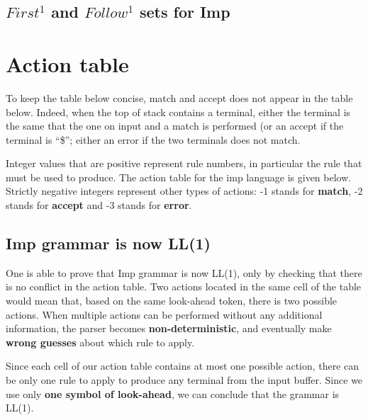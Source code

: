 \subsection{$First^1$ and $Follow^1$ sets for Imp}

    {\small\ttfamily
      
    }


\section{Action table}

To keep the table below concise, match and accept does not appear in the table below. Indeed, when the top of stack
contains a terminal, either the terminal is the same that the one on input and a match is performed (or an accept if the
terminal is ``\$''; either an error if the two terminals does not match.

Integer values that are positive represent rule numbers, in particular the rule that must be used to produce. The
action table for the imp language is given below.
Strictly negative integers represent other types of actions: -1 stands for \textbf{match}, -2 stands for \textbf{accept} and -3 stands for \textbf{error}.

{\small\ttfamily
  
}


\subsection{Imp grammar is now LL(1)}

One is able to prove that Imp grammar is now LL(1), only by checking that there is no conflict in the action table.
Two actions located in the same cell of the table would mean that, based on the same look-ahead token, 
there is two possible actions. When multiple actions can be performed without any additional information,
the parser becomes \textbf{non-deterministic}, and eventually make \textbf{wrong guesses} about which rule to apply.

Since each cell of our action table contains at most one possible action, there can be only one rule to apply to produce
any terminal from the input buffer. Since we use only \textbf{one symbol of look-ahead}, we can conclude
that the grammar is LL(1).

